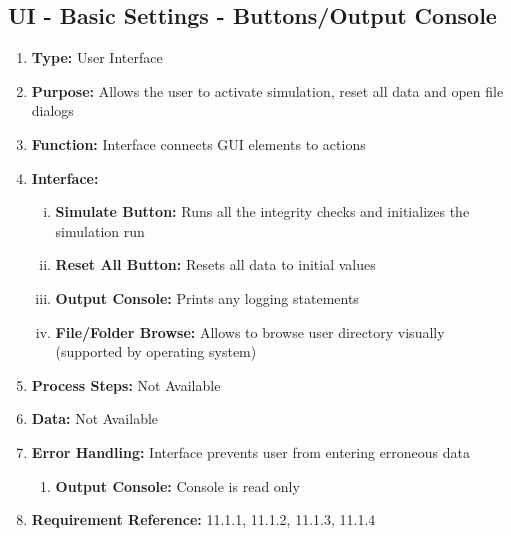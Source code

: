 \documentclass[paper=letter, fontsize=10pt]{scrartcl}
\numberwithin{equation}{section}		%
\numberwithin{figure}{section}			%
\numberwithin{table}{section}				%
\begin{document}
\subsection{UI - Basic Settings - Buttons/Output Console}
\begin{enumerate}[]
	\item \textbf{Type:} User Interface
	\item \textbf{Purpose:} Allows the user to activate simulation, reset all data and open file dialogs
	\item \textbf{Function:} Interface connects GUI elements to actions
	\item \textbf{Interface:} 
	\begin{enumerate}[(i)]
		\item \textbf{Simulate Button:} Runs all the integrity checks and initializes the simulation run
		\item \textbf{Reset All Button:} Resets all data to initial values
		\item \textbf{Output Console:} Prints any logging statements
		\item \textbf{File/Folder Browse:} Allows to browse user directory visually (supported by operating system)
	\end{enumerate}
	\item \textbf{Process Steps:} Not Available
	\item \textbf{Data:} Not Available
	\item \textbf{Error Handling:} Interface prevents user from entering erroneous data 
	\begin{enumerate}[]
		\item \textbf{Output Console:} Console is read only
	\end{enumerate}
	\item \textbf{Requirement Reference:} 11.1.1, 11.1.2, 11.1.3, 11.1.4
\end{enumerate}
\end{document}
